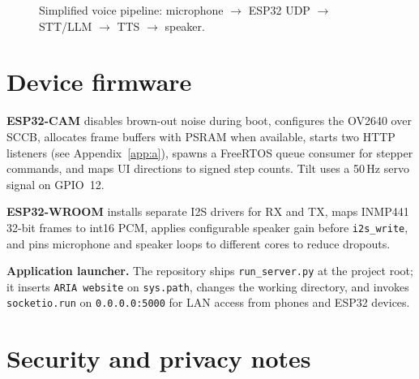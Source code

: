 \documentclass[12pt,a4paper]{report}
\begin{document}
\begin{figure}[htbp]
\centering
{}
\caption{Simplified voice pipeline: microphone $\rightarrow$ ESP32 UDP $\rightarrow$ STT/LLM $\rightarrow$ TTS $\rightarrow$ speaker.}
\label{fig:voice-flow}
\end{figure}

\section{Device firmware}

\textbf{ESP32-CAM} disables brown-out noise during boot, configures the OV2640 over SCCB, allocates frame buffers with PSRAM when available, starts two HTTP listeners (see Appendix~\ref{app:a}), spawns a FreeRTOS queue consumer for stepper commands, and maps UI directions to signed step counts. Tilt uses a 50\,Hz servo signal on GPIO~12.

\textbf{ESP32-WROOM} installs separate I2S drivers for RX and TX, maps INMP441 32-bit frames to int16 PCM, applies configurable speaker gain before \texttt{i2s\_write}, and pins microphone and speaker loops to different cores to reduce dropouts.

\textbf{Application launcher.} The repository ships \texttt{run\_server.py} at the project root; it inserts \texttt{ARIA website} on \texttt{sys.path}, changes the working directory, and invokes \texttt{socketio.run} on \texttt{0.0.0.0:5000} for LAN access from phones and ESP32 devices.

\section{Security and privacy notes}
\end{document}
